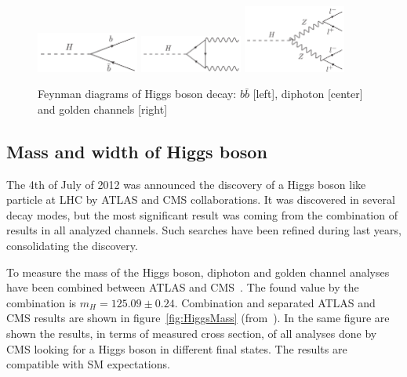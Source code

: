 \begin{figure}[!Hhtbp]
  \begin{center}
    \includegraphics[width=0.3\textwidth]{figs/BB_H.png}
    \includegraphics[width=0.3\textwidth]{figs/Diphoton_H.png}
    \includegraphics[width=0.3\textwidth]{figs/Golden_H.png}
    \caption{Feynman diagrams of Higgs boson decay: $b\bar{b}$ [left], diphoton [center] and golden channels [right]}
    \label{fig:HiggsDecays}
  \end{center}
\end{figure}

\subsection{Mass and width of Higgs boson}

The 4th of July of 2012 was announced the discovery of a Higgs boson like particle at LHC by ATLAS and CMS collaborations. It was discovered in several decay modes, but the most significant result was coming from the combination of results in all analyzed channels. Such searches have been refined during last years, consolidating the discovery. 

To measure the mass of the Higgs boson, diphoton and golden channel analyses have been combined between ATLAS and CMS~\cite{Aad:2015zhl}. The found value by the combination is $m_{H}=125.09\pm 0.24$. Combination and separated ATLAS and CMS results are shown in figure~\ref{fig:HiggsMass} (from~\cite{Aad:2015zhl,CMS:2014ega,ATLAS-CONF-2015-007}). In the same figure are shown the results, in terms of measured cross section, of all analyses done by CMS looking for a Higgs boson in different final states. The results are compatible with SM expectations.

